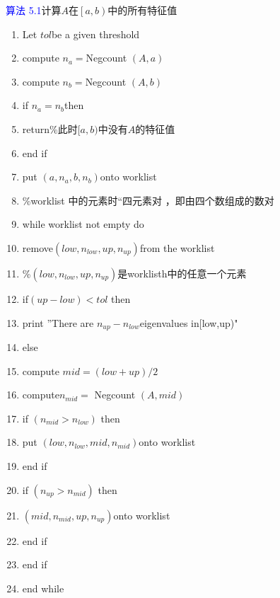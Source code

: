 \documentclass[notheorems,serif]{beamer}
\begin{document}
\textcolor{blue}{算法 5.1}\quad 计算$A$在$\left[a, b\right)$中的所有特征值
\begin{enumerate}[1:]
	\item Let $tol$be a given threshold
	\item compute $n_a=$Negcount $(A, a)$
	\item compute $n_b=$Negcount $(A, b)$
	\item if $n_a=n_b$then
	\item \quad return\qquad \%此时$[a,b)$中没有$A$的特征值
	\item end if
	\item put $\left(a, n_{a}, b, n_{b}\right)$onto worklist
	\item \quad \%worklist 中的元素时“四元素对
	，即由四个数组成的数对
	\item while worklist not empty do
	\item \quad remove$\left(l o w, n_{l o w}, u p, n_{u p}\right)$from the worklist
	\item \quad \%$\left(l o w, n_{l o w}, u p, n_{u p}\right)$是worklisth中的任意一个元素
	\item \quad if$(up-low)<tol$ then
	\item \qquad print ”There are $n_{up}-n_{low}$eigenvalues in[low,up)"
	\item \quad else
	\item \qquad compute $mid=(low+up)/2$
	\item \qquad compute$n_{m i d}=$ Negcount $(A, m i d)$
	\item \qquad if $\left(n_{m i d}>n_{l o w}\right)$ then
	\item \qquad \quad put $\left(l o w, n_{l o w}, m i d, n_{m i d}\right)$onto worklist
	\item \qquad end if
	\item \qquad if $\left(n_{up}>n_{mid}\right)$ then
	\item \qquad \quad $\left(m i d, n_{m i d}, u p, n_{u p}\right)$onto worklist
	\item \qquad end if
	\item \quad end if
	\item end while
\end{enumerate}
\end{document}
